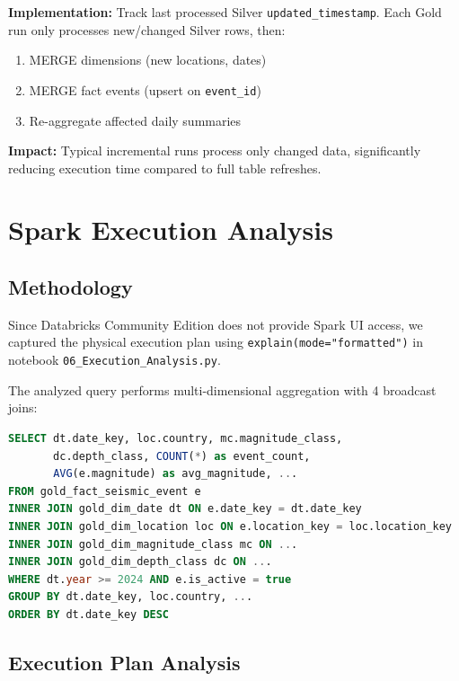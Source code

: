 \documentclass[11pt,a4paper]{article}
\begin{document}
\noindent\textbf{Implementation:} Track last processed Silver \texttt{updated\_timestamp}. Each Gold run only processes new/changed Silver rows, then:
\begin{enumerate}[nosep]
    \item MERGE dimensions (new locations, dates)
    \item MERGE fact events (upsert on \texttt{event\_id})
    \item Re-aggregate affected daily summaries
\end{enumerate}

\noindent\textbf{Impact:} Typical incremental runs process only changed data, significantly reducing execution time compared to full table refreshes.

\newpage

\section{Spark Execution Analysis}

\subsection{Methodology}

Since Databricks Community Edition does not provide Spark UI access, we captured the physical execution plan using \texttt{explain(mode="formatted")} in notebook \texttt{06\_Execution\_Analysis.py}.

The analyzed query performs multi-dimensional aggregation with 4 broadcast joins:

\begin{lstlisting}[language=SQL, basicstyle=\small\ttfamily, breaklines=true]
SELECT dt.date_key, loc.country, mc.magnitude_class, 
       dc.depth_class, COUNT(*) as event_count,
       AVG(e.magnitude) as avg_magnitude, ...
FROM gold_fact_seismic_event e
INNER JOIN gold_dim_date dt ON e.date_key = dt.date_key
INNER JOIN gold_dim_location loc ON e.location_key = loc.location_key
INNER JOIN gold_dim_magnitude_class mc ON ...
INNER JOIN gold_dim_depth_class dc ON ...
WHERE dt.year >= 2024 AND e.is_active = true
GROUP BY dt.date_key, loc.country, ...
ORDER BY dt.date_key DESC
\end{lstlisting}

\subsection{Execution Plan Analysis}
\end{document}
